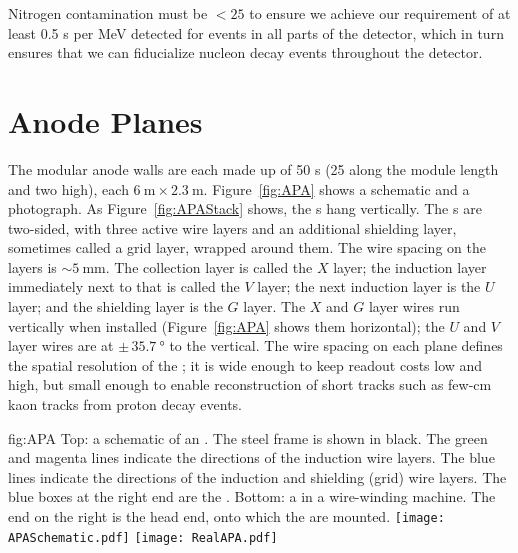 Nitrogen contamination must be $<\!25$  to ensure we achieve our requirement of at least 0.5 \phel{}s per MeV detected for events in all parts of the detector, which in turn ensures 
that we can fiducialize nucleon decay events throughout the detector.

\section{Anode Planes}
\label{sec:exec-sp-apa}

The modular anode walls are each made up of 50 s (25 along the module length and two high), each $\SI{6}{\meter}\times\SI{2.3}{\meter}$. Figure~\ref{fig:APA} shows a schematic and a photograph. As Figure~\ref{fig:APAStack} shows, the s hang vertically. The s are two-sided, with three active wire layers and an additional shielding layer, sometimes called a grid layer, wrapped around them. The wire spacing on the layers is $\sim\!\SI{5}{\mm}$. The collection layer is called the $X$ layer; the induction layer immediately next to that is called the $V$ layer; the next induction layer is the $U$ layer; and the shielding layer is the $G$ layer. The $X$ and $G$ layer wires run vertically when installed  (Figure~\ref{fig:APA} shows them horizontal); the $U$ and $V$ layer wires are at $\pm\,\SI{35.7}{\degree}$ to the vertical. The 
wire spacing on each plane defines the spatial resolution of the ; it is wide enough to keep readout costs low and  high, but small enough to enable reconstruction of 
short tracks such as few-\si{\cm} kaon tracks from proton decay events.

\begin{dunefigure}{fig:APA}
{Top: a schematic of an . The steel  frame is shown in black. The green and magenta lines indicate the directions of the induction wire layers. The blue lines indicate the directions of the induction and shielding (grid) wire layers. The blue boxes at the right end  are the . Bottom: a   in a wire-winding machine. The end on the right is the head end, onto which the  are mounted.}
\texttt{[image: APASchematic.pdf]}
\texttt{[image: RealAPA.pdf]}
\end{dunefigure}

